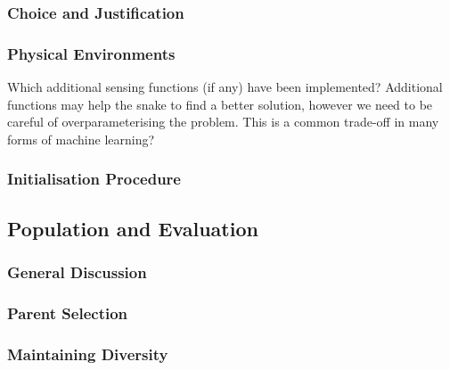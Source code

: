 \documentclass{article}
\begin{document}


\subsubsection{Choice and Justification}

\subsubsection{Physical Environments}

Which additional sensing functions (if any) have been implemented? Additional functions may help the snake to find a better solution, however we need to be careful of overparameterising the problem. This is a common trade-off in many forms of machine learning?

\subsubsection{Initialisation Procedure}

\subsection{Population and Evaluation}
\subsubsection{General Discussion}


\subsubsection{Parent Selection}


\subsubsection{Maintaining Diversity}
\end{document}
